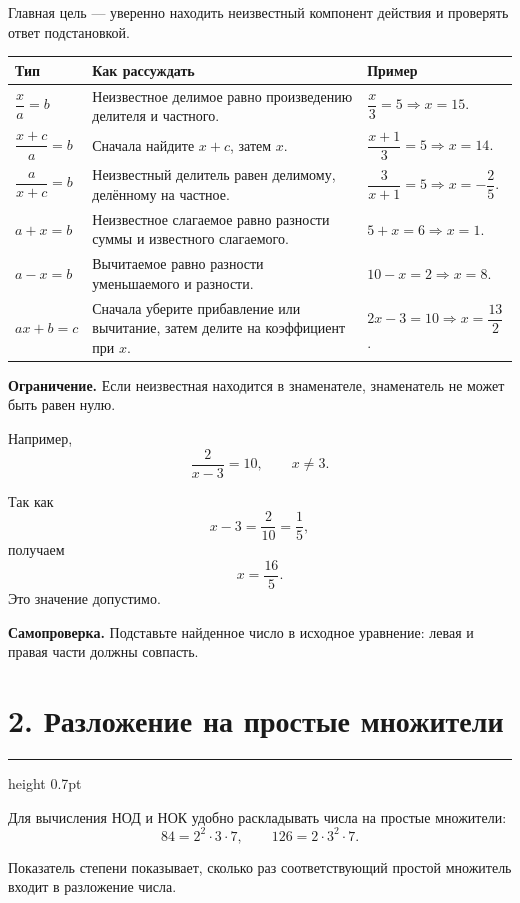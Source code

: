 \documentclass[a4paper,12pt]{article}
\newcommand{\sectionline}{%
  \par\vspace{0.1em}%
  {\color{accent}\hrule height 0.7pt}%
  \vspace{0.55em}}
\begin{document}
Главная цель --- уверенно находить неизвестный компонент действия
и проверять ответ подстановкой.

\begin{tabularx}{\linewidth}{@{}>{\bfseries}l X X@{}}
\toprule
Тип & Как рассуждать & Пример \\
\midrule

$\dfrac{x}{a}=b$
&
Неизвестное делимое равно произведению делителя и частного.
&
$\dfrac{x}{3}=5 \Rightarrow x=15$.
\\

$\dfrac{x+c}{a}=b$
&
Сначала найдите $x+c$, затем $x$.
&
$\dfrac{x+1}{3}=5 \Rightarrow x=14$.
\\

$\dfrac{a}{x+c}=b$
&
Неизвестный делитель равен делимому, делённому на частное.
&
$\dfrac{3}{x+1}=5 \Rightarrow x=-\dfrac25$.
\\

$a+x=b$
&
Неизвестное слагаемое равно разности суммы и известного слагаемого.
&
$5+x=6 \Rightarrow x=1$.
\\

$a-x=b$
&
Вычитаемое равно разности уменьшаемого и разности.
&
$10-x=2 \Rightarrow x=8$.
\\

$ax+b=c$
&
Сначала уберите прибавление или вычитание,
затем делите на коэффициент при $x$.
&
$2x-3=10 \Rightarrow x=\dfrac{13}{2}$.
\\

\bottomrule
\end{tabularx}

\textbf{Ограничение.}
Если неизвестная находится в знаменателе,
знаменатель не может быть равен нулю.

Например,
\[
\frac{2}{x-3}=10,
\qquad
x\ne3.
\]

Так как
\[
x-3=\frac{2}{10}=\frac15,
\]
получаем
\[
x=\frac{16}{5}.
\]
Это значение допустимо.

\textbf{Самопроверка.}
Подставьте найденное число в исходное уравнение:
левая и правая части должны совпасть.

\section*{2. Разложение на простые множители}
\sectionline

Для вычисления НОД и НОК удобно раскладывать числа
на простые множители:
\[
84=2^2\cdot3\cdot7,
\qquad
126=2\cdot3^2\cdot7.
\]

Показатель степени показывает,
сколько раз соответствующий простой множитель
входит в разложение числа.
\end{document}
